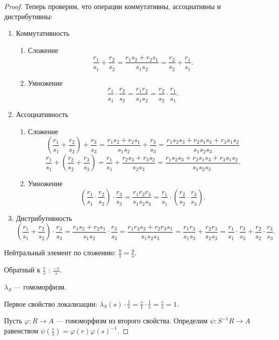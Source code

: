 \documentclass[11pt]{book}
\theoremstyle{definition}
\theoremstyle{plain}
\theoremstyle{plain}
\theoremstyle{definition}
\theoremstyle{remark}
\begin{document}
\begin{proof}
    Теперь проверим, что операции коммутативны, ассоциативны и дистрибутивны:
    \begin{enumerate}
	\item  Коммутативность
	    \begin{enumerate}
		\item Сложение
		    \[
			\frac{r_1}{s_1} + \frac{r_2}{s_2} = \frac{r_1s_2+r_2s_1}{s_1s_2} = \frac{r_2}{s_2} + \frac{r_1}{s_1}
		    .\]
		\item Умножение
		    \[
			\frac{r_1}{s_1} \cdot \frac{r_2}{s_2} = \frac{r_1r_2}{s_1s_2} = \frac{r_2}{s_2} \cdot \frac{r_1}{s_1}
		    .\]
	    \end{enumerate}
	\item Ассоциативность
	    \begin{enumerate}
		\item Сложение
		    \[
			\left( \frac{r_1}{s_1} + \frac{r_2}{s_2} \right) + \frac{r_3}{s_3} = \frac{r_1s_2 + r_2 s_1}{s_1s_2} + \frac{r_3}{s_3} = \frac{r_1s_2s_3 + r_2s_1s_3 + r_3s_1s_2}{s_1s_2s_3}
		    \]
		    \[
			\frac{r_1}{s_1} + \left( \frac{r_2}{s_2}  + \frac{r_3}{s_3}\right) = \frac{r_1}{s_1} + \frac{r_2s_3 + r_3 s_2}{s_2s_3}= \frac{r_1s_2s_3 + r_2s_1s_3 + r_3s_1s_2}{s_1s_2s_3}
		    .\]
		\item Умножение
		    \[
			\left( \frac{r_1}{s_1} \cdot \frac{r_2}{s_2} \right)  \cdot \frac{r_3}{s_3} = \frac{r_1r_2r_3}{s_1s_2s_3} = \frac{r_1}{s_1} \cdot \left( \frac{r_2}{s_2} \cdot \frac{r_3}{s_3} \right)
		    .\]
	    \end{enumerate}
	\item Дистрибутивность
	    \[
		\left( \frac{r_1}{s_1} + \frac{r_2}{s_2} \right) \cdot \frac{r_3}{s_3} =  \frac{r_1s_2 + r_2s_1}{s_1s_2} \cdot \frac{r_3}{s_3} = \frac{r_1r_3s_2+r_2r_3s_1}{s_1s_2s_3} = \frac{r_1r_3}{s_1s_3} + \frac{r_2r_3}{s_2s_3} = \frac{r_1}{s_1}\cdot \frac{r_3}{s_3} + \frac{r_2}{s_2} \cdot \frac{r_3}{s_3}
	    .\]
    \end{enumerate}

    Нейтральный элемент по сложению: $ \frac{0}{1} = \frac{0}{s}$.

    Обратный к $ \frac{r}{s}$ : $ \frac{-r}{s}$.
    
    $ \lambda_S$ --- гомоморфизм.

     Первое свойство локализации:
     $\lambda_S(s) \cdot \frac{1}{s } =  \frac{s}{1 }\cdot \frac{1}{s} = \frac{s}{s}=1$.

     Пусть $ \varphi : R \to  A$ --- гомоморфизм из второго свойства. Определим $ \psi: S^{-1}R \to  A$ равенством $ \psi( \frac{r}{s}) = \varphi (r) \varphi (s)^{-1}$.


\end{proof}
\end{document}
